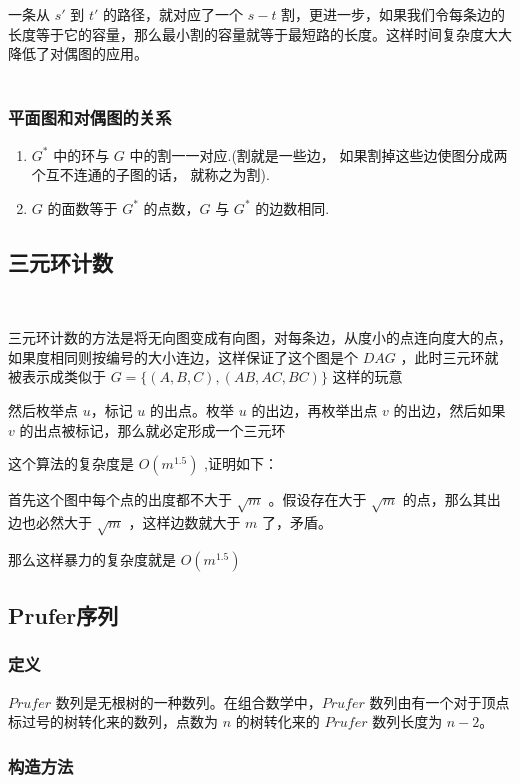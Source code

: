 	一条从 $s'$ 到 $t'$ 的路径，就对应了一个 $s-t$ 割，更进一步，如果我们令每条边的长度等于它的容量，那么最小割的容量就等于最短路的长度。这样时间复杂度大大降低了对偶图的应用。\\
	\\
	\subsubsection{平面图和对偶图的关系}
	\begin{enumerate}
		\item $G^*$ 中的环与 $G$ 中的割一一对应.(割就是一些边， 如果割掉这些边使图分成两个互不连通的子图的话， 就称之为割).
		\item $G$ 的面数等于 $G^*$ 的点数，$G$ 与 $G^*$ 的边数相同.
	\end{enumerate}
	\newpage
	\subsection{三元环计数}~
	
	三元环计数的方法是将无向图变成有向图，对每条边，从度小的点连向度大的点，如果度相同则按编号的大小连边，这样保证了这个图是个 $DAG$ ，此时三元环就被表示成类似于 $G=\{(A,B,C),(AB,AC,BC)\}$ 这样的玩意
	
	然后枚举点 $u$，标记 $u$ 的出点。枚举 $u$ 的出边，再枚举出点 $v$ 的出边，然后如果 $v$ 的出点被标记，那么就必定形成一个三元环
	
	这个算法的复杂度是 $O(m^{1.5})$ ,证明如下：
	
	首先这个图中每个点的出度都不大于 $\sqrt{m}$ 。假设存在大于 $\sqrt{m}$ 的点，那么其出边也必然大于 $\sqrt{m}$ ，这样边数就大于 $m$ 了，矛盾。
	
	那么这样暴力的复杂度就是 $O(m^{1.5})$\\
	
	\newpage
	\subsection{Prufer序列}
	\subsubsection{定义}
	$Prufer$ 数列是无根树的一种数列。在组合数学中，$Prufer$ 数列由有一个对于顶点标过号的树转化来的数列，点数为 $n$ 的树转化来的 $Prufer$ 数列长度为 $n-2$。\\
	\subsubsection{构造方法}
